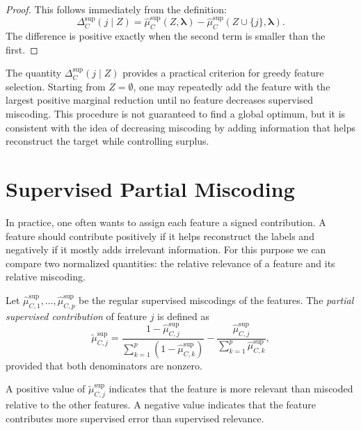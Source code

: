 \begin{proof}
This follows immediately from the definition:
\[
    \Delta_C^{\mathrm{sup}}(j\mid Z)
    =
    \hat\mu_C^{\mathrm{sup}}(Z,\boldsymbol{\lambda})
    -
    \hat\mu_C^{\mathrm{sup}}(Z\cup\{j\},\boldsymbol{\lambda}).
\]
The difference is positive exactly when the second term is smaller than the first.
\end{proof}

The quantity \(\Delta_C^{\mathrm{sup}}(j\mid Z)\) provides a practical criterion for greedy feature selection. Starting from \(Z=\emptyset\), one may repeatedly add the feature with the largest positive marginal reduction until no feature decreases supervised miscoding. This procedure is not guaranteed to find a global optimum, but it is consistent with the idea of decreasing miscoding by adding information that helps reconstruct the target while controlling surplus.

\section{Supervised Partial Miscoding}
\label{sec:supervised_partial_miscoding}

In practice, one often wants to assign each feature a signed contribution. A feature should contribute positively if it helps reconstruct the labels and negatively if it mostly adds irrelevant information. For this purpose we can compare two normalized quantities: the relative relevance of a feature and its relative miscoding.

\begin{definition}
\label{def:supervised_partial_miscoding}
Let \(\hat\mu_{C,1}^{\mathrm{sup}},\ldots,\hat\mu_{C,p}^{\mathrm{sup}}\) be the regular supervised miscodings of the features. The \emph{partial supervised contribution} of feature \(j\) is defined as
\[
    \tilde\mu_{C,j}^{\mathrm{sup}}
    =
    \frac{
        1-\hat\mu_{C,j}^{\mathrm{sup}}
    }
    {
        \sum_{k=1}^p \left(1-\hat\mu_{C,k}^{\mathrm{sup}}\right)
    }
    -
    \frac{
        \hat\mu_{C,j}^{\mathrm{sup}}
    }
    {
        \sum_{k=1}^p \hat\mu_{C,k}^{\mathrm{sup}}
    },
\]
provided that both denominators are nonzero.
\end{definition}

A positive value of \(\tilde\mu_{C,j}^{\mathrm{sup}}\) indicates that the feature is more relevant than miscoded relative to the other features. A negative value indicates that the feature contributes more supervised error than supervised relevance.

